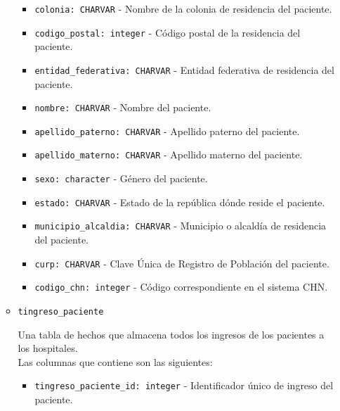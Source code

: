 \begin{itemize}
\begin{itemize}
\begin{itemize}
                \item \texttt{colonia: CHARVAR} - Nombre de la colonia de residencia del paciente.
                
                \item \texttt{codigo\_postal: integer} - Código postal de la residencia del paciente.
                
                \item \texttt{entidad\_federativa: CHARVAR} - Entidad federativa de residencia del paciente.
                
                \item \texttt{nombre: CHARVAR} - Nombre del paciente.
                
                \item \texttt{apellido\_paterno: CHARVAR} - Apellido paterno del paciente.
                
                \item \texttt{apellido\_materno: CHARVAR} - Apellido materno del paciente.
                
                \item \texttt{sexo: character} - Género del paciente.
                
                \item \texttt{estado: CHARVAR} - Estado de la república dónde reside el paciente.
                
                \item \texttt{municipio\_alcaldia: CHARVAR} - Municipio o alcaldía de residencia del paciente.
                
                \item \texttt{curp: CHARVAR} - Clave Única de Registro de Población del paciente.
                
                \item \texttt{codigo\_chn: integer} - Código correspondiente en el sistema CHN.
            \end{itemize}


            
            \item \texttt{tingreso\_paciente}

            Una tabla de hechos que almacena todos los ingresos de los pacientes a los hospitales.\\

            Las columnas que contiene son las siguientes:
            \begin{itemize}
                \item \texttt{tingreso\_paciente\_id: integer} - Identificador único de ingreso del paciente.
                

\end{itemize}
\end{itemize}
\end{itemize}
